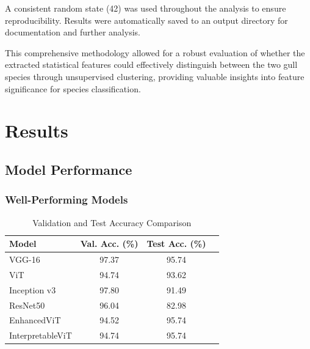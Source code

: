 \documentclass[a4paper,12pt]{report}
\begin{document}
A consistent random state (42) was used throughout the analysis to ensure reproducibility. Results were automatically saved to an output directory for documentation and further analysis.

This comprehensive methodology allowed for a robust evaluation of whether the extracted statistical features could effectively distinguish between the two gull species through unsupervised clustering, providing valuable insights into feature significance for species classification.

\chapter{Results}

\section{Model Performance}

\subsection{Well-Performing Models}

\begin{table}[htbp]
    \centering
    \caption{Validation and Test Accuracy Comparison}
    \label{tab:val_test_comparison}
    \begin{tabular}{lccc}
    \toprule
    \textbf{Model} & \textbf{Val. Acc. (\%)} & \textbf{Test Acc. (\%)} \\
    \midrule
    VGG-16  & 97.37 & 95.74 \\
    ViT & 94.74 & 93.62 \\
    Inception v3 & 97.80 & 91.49  \\
    ResNet50 & 96.04 & 82.98 \\
    EnhancedViT & 94.52 & 95.74  \\
    InterpretableViT & 94.74 & 95.74 \\
    \bottomrule
    \end{tabular}
\end{table}
\end{document}

